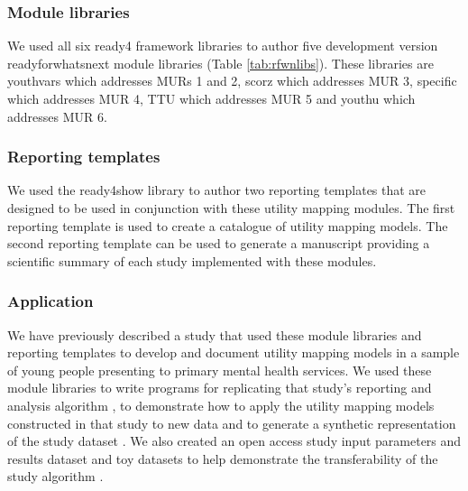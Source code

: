 \documentclass[sn-vancouver,Numbered,pdflatex]{sn-jnl}
\theoremstyle{remark}
\theoremstyle{definition}
\begin{document}
\hypertarget{module-libraries}{%
\subsubsection{Module libraries}\label{module-libraries}}

We used all six ready4 framework libraries to author five development version readyforwhatsnext module libraries (Table \ref{tab:rfwnlibs}). These libraries are youthvars \citep{hamilton_matthew_2022_6084467} which addresses MURs 1 and 2, scorz \citep{hamilton_matthew_2022_6084824} which addresses MUR 3, specific \citep{hamilton_matthew_2022_6116701} which addresses MUR 4, TTU \citep{gao_caroline_2022_6130155} which addresses MUR 5 and youthu \citep{matthew_p_hamilton_2021_5646669} which addresses MUR 6.

\hypertarget{reporting-templates}{%
\subsubsection{Reporting templates}\label{reporting-templates}}

We used the ready4show library to author two reporting templates that are designed to be used in conjunction with these utility mapping modules. The first reporting template \citep{hamilton_matthew_2022_6116385} is used to create a catalogue of utility mapping models. The second reporting template \citep{matthew_p_hamilton_2022_5976988} can be used to generate a manuscript providing a scientific summary of each study implemented with these modules.

\hypertarget{application}{%
\subsubsection{Application}\label{application}}

We have previously described a study \citep{Hamilton2021.07.07.21260129} that used these module libraries and reporting templates to develop and document utility mapping models in a sample of young people presenting to primary mental health services. We used these module libraries to write programs for replicating that study's reporting and analysis algorithm \citep{hamilton_matthew_2022_6129906}, to demonstrate how to apply the utility mapping models constructed in that study to new data \citep{hamilton_matthew_2022_6416330} and to generate a synthetic representation of the study dataset \citep{hamilton_matthew_p_2022_6321821}. We also created an open access study input parameters and results dataset \citep{DVN/DKDIB0_2021} and toy datasets to help demonstrate the transferability of the study algorithm \citep{DVN/HJXYKQ_2021}.
\end{document}
